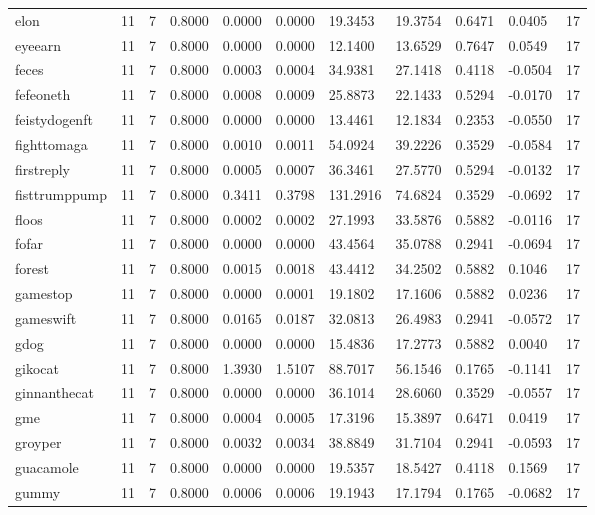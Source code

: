 \begin{table}[htbp]
\begin{tabular}{lllllllllll}
elon & 11 & 7 & 0.8000 & 0.0000 & 0.0000 & 19.3453 & 19.3754 & 0.6471 & 0.0405 & 17 \\
eyeearn & 11 & 7 & 0.8000 & 0.0000 & 0.0000 & 12.1400 & 13.6529 & 0.7647 & 0.0549 & 17 \\
feces & 11 & 7 & 0.8000 & 0.0003 & 0.0004 & 34.9381 & 27.1418 & 0.4118 & -0.0504 & 17 \\
fefeoneth & 11 & 7 & 0.8000 & 0.0008 & 0.0009 & 25.8873 & 22.1433 & 0.5294 & -0.0170 & 17 \\
feistydogenft & 11 & 7 & 0.8000 & 0.0000 & 0.0000 & 13.4461 & 12.1834 & 0.2353 & -0.0550 & 17 \\
fighttomaga & 11 & 7 & 0.8000 & 0.0010 & 0.0011 & 54.0924 & 39.2226 & 0.3529 & -0.0584 & 17 \\
firstreply & 11 & 7 & 0.8000 & 0.0005 & 0.0007 & 36.3461 & 27.5770 & 0.5294 & -0.0132 & 17 \\
fisttrumppump & 11 & 7 & 0.8000 & 0.3411 & 0.3798 & 131.2916 & 74.6824 & 0.3529 & -0.0692 & 17 \\
floos & 11 & 7 & 0.8000 & 0.0002 & 0.0002 & 27.1993 & 33.5876 & 0.5882 & -0.0116 & 17 \\
fofar & 11 & 7 & 0.8000 & 0.0000 & 0.0000 & 43.4564 & 35.0788 & 0.2941 & -0.0694 & 17 \\
forest & 11 & 7 & 0.8000 & 0.0015 & 0.0018 & 43.4412 & 34.2502 & 0.5882 & 0.1046 & 17 \\
gamestop & 11 & 7 & 0.8000 & 0.0000 & 0.0001 & 19.1802 & 17.1606 & 0.5882 & 0.0236 & 17 \\
gameswift & 11 & 7 & 0.8000 & 0.0165 & 0.0187 & 32.0813 & 26.4983 & 0.2941 & -0.0572 & 17 \\
gdog & 11 & 7 & 0.8000 & 0.0000 & 0.0000 & 15.4836 & 17.2773 & 0.5882 & 0.0040 & 17 \\
gikocat & 11 & 7 & 0.8000 & 1.3930 & 1.5107 & 88.7017 & 56.1546 & 0.1765 & -0.1141 & 17 \\
ginnanthecat & 11 & 7 & 0.8000 & 0.0000 & 0.0000 & 36.1014 & 28.6060 & 0.3529 & -0.0557 & 17 \\
gme & 11 & 7 & 0.8000 & 0.0004 & 0.0005 & 17.3196 & 15.3897 & 0.6471 & 0.0419 & 17 \\
groyper & 11 & 7 & 0.8000 & 0.0032 & 0.0034 & 38.8849 & 31.7104 & 0.2941 & -0.0593 & 17 \\
guacamole & 11 & 7 & 0.8000 & 0.0000 & 0.0000 & 19.5357 & 18.5427 & 0.4118 & 0.1569 & 17 \\
gummy & 11 & 7 & 0.8000 & 0.0006 & 0.0006 & 19.1943 & 17.1794 & 0.1765 & -0.0682 & 17 \\

\end{tabular}
\end{table}

